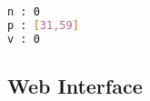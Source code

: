 \begin{lstlisting}[language=sh,caption={Result for primefac.srl},label={lst:primefac_result}]
n : 0
p : [31,59]
v : 0
\end{lstlisting}

\subsection{Web Interface}


\\
\\

